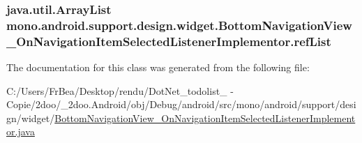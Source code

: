 \hypertarget{classmono_1_1android_1_1support_1_1design_1_1widget_1_1_bottom_navigation_view___on_navigation_ie9d71c6c186664ed279b77f9f21d9a3f_313fed3afa2c87d2876c8041fc731c95}{
\subsubsection[{refList}]{\setlength{\rightskip}{0pt plus 5cm}java.util.ArrayList {\bf mono.android.support.design.widget.BottomNavigationView\_\-OnNavigationItemSelectedListenerImplementor.refList}}}
\label{classmono_1_1android_1_1support_1_1design_1_1widget_1_1_bottom_navigation_view___on_navigation_ie9d71c6c186664ed279b77f9f21d9a3f_313fed3afa2c87d2876c8041fc731c95}




The documentation for this class was generated from the following file:\begin{CompactItemize}
\item 
C:/Users/FrBea/Desktop/rendu/DotNet\_\-todolist\_ - Copie/2doo/\_\-2doo.Android/obj/Debug/android/src/mono/android/support/design/widget/\hyperlink{_bottom_navigation_view___on_navigation_item_selected_listener_implementor_8java}{BottomNavigationView\_\-OnNavigationItemSelectedListenerImplementor.java}\end{CompactItemize}
